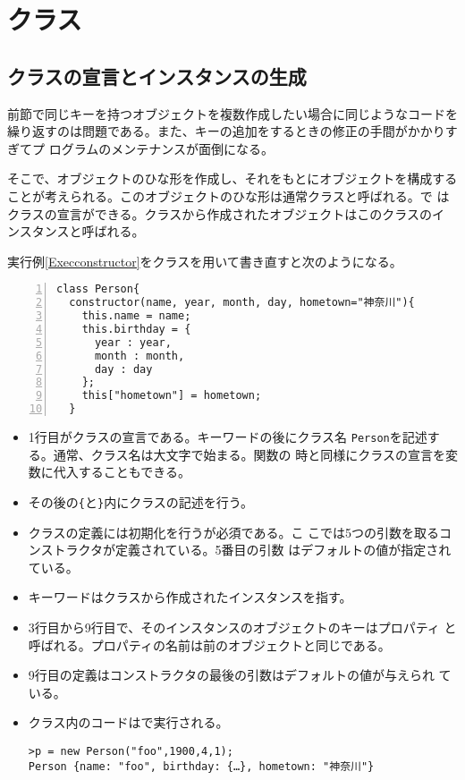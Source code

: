 \section{クラス}
\subsection{クラスの宣言とインスタンスの生成}
前節で同じキーを持つオブジェクトを複数作成したい場合に同じようなコードを
繰り返すのは問題である。また、キーの追加をするときの修正の手間がかかりすぎてプ
ログラムのメンテナンスが面倒になる。

そこで、オブジェクトのひな形を作成し、それをもとにオブジェクトを構成する
ことが考えられる。このオブジェクトのひな形は通常クラスと呼ばれる。\ES で
はクラスの宣言ができる。クラスから作成されたオブジェクトはこのクラスのイ
ンスタンスと呼ばれる。
\begin{Exec}\upshape\label{ExecconstructorClass}
実行例\ref{Execconstructor}をクラスを用いて書き直すと次のようになる。
\begin{Verbatim}[numbers=left]
class Person{
  constructor(name, year, month, day, hometown="神奈川"){
    this.name = name;
    this.birthday = {
      year : year,
      month : month,
      day : day
    };
    this["hometown"] = hometown;
  }
\end{Verbatim}
\begin{itemize}
 \item 1行目がクラスの宣言である。キーワードの後にクラス名
       \texttt{Person}を記述する。通常、クラス名は大文字で始まる。関数の
       時と同様にクラスの宣言を変数に代入することもできる。
 \item その後の\Verb+{+と\Verb+}+内にクラスの記述を行う。
 \item クラスの定義には初期化を行うが必須である。こ
       こでは5つの引数を取るコンストラクタが定義されている。5番目の引数
       はデフォルトの値が指定されている。
 \item キーワードはクラスから作成されたインスタンスを指す。
 \item 3行目から9行目で、そのインスタンスのオブジェクトのキーはプロパティ
			 と呼ばれる。プロパティの名前は前のオブジェクトと同じである。
 \item 9行目の定義はコンストラクタの最後の引数はデフォルトの値が与えられ
			 ている。
 \item クラス内のコードは\Strict で実行される。
\begin{Verbatim}
>p = new Person("foo",1900,4,1);
Person {name: "foo", birthday: {…}, hometown: "神奈川"}
\end{Verbatim}
\end{itemize}

\end{Exec}
